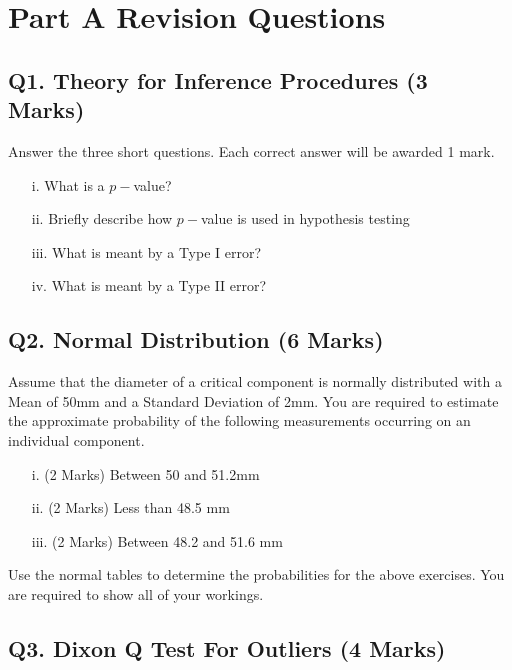\documentclass[a4paper,12pt]{article}
\begin{document}
\section*{Part A Revision Questions}
\subsection*{Q1. Theory for Inference Procedures (3 Marks)}
Answer the three short questions. Each correct answer will be awarded 1 mark.
\begin{itemize}
 \item[i.] What is a $p-$value?
\item[ii.] Briefly describe how $p-$value is used in hypothesis testing
\item[iii.] What is meant by a Type I error?
\item[iv.] What is meant by a Type II error?
\end{itemize}
%

\subsection*{Q2. Normal Distribution (6 Marks)} %
Assume that the diameter of a critical component is normally distributed with a Mean of 50mm and a Standard Deviation of 2mm. You are required  to estimate the approximate probability of the following measurements occurring on an individual component.
\begin{itemize}
	\item [i.](2 Marks)	Between 50 and 51.2mm
	\item [ii.](2 Marks) Less than 48.5 mm
	\item [iii.](2 Marks) Between 48.2 and 51.6 mm
\end{itemize}

\noindent Use the normal tables to determine the probabilities for the above exercises. You are required to show all of your workings.

\subsection*{Q3. Dixon Q Test For Outliers (4 Marks)}
\end{document}

